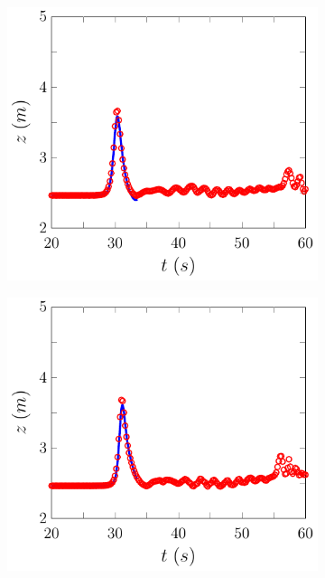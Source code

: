 \begin{figure}
\begin{subfigure}{0.5\textwidth}
		\vspace{0.5cm}
	\end{subfigure}
	\begin{subfigure}{0.5\textwidth}
		\includegraphics[width=\textwidth]{./chp6/figures/Experiment/Roeber/Trial8/FDVM/WG3-figure0.pdf}
		\vspace{0.5cm}
	\end{subfigure}%
	\begin{subfigure}{0.5\textwidth}
		\includegraphics[width=\textwidth]{./chp6/figures/Experiment/Roeber/Trial8/FDVM/WG4-figure0.pdf}

\end{subfigure}
\end{figure}
